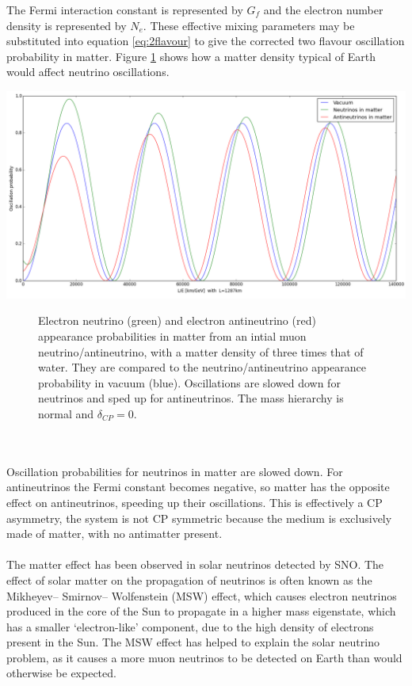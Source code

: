 \documentclass[12pt]{article}
\begin{document}
The Fermi interaction constant is represented by $G_f$ and the electron number density is represented by $N_e$. These effective mixing parameters may be substituted into equation \ref{eq:2flavour} to give the corrected two flavour oscillation probability in matter. Figure \ref{fig:2_flavourmatter} shows how a matter density typical of Earth would affect neutrino oscillations.
\begin{center}
\includegraphics[scale=0.4]{2_flavourmatter.png}
\begin{figure}[h!]
\caption{Electron neutrino (green) and electron antineutrino (red) appearance probabilities in matter from an intial muon neutrino/antineutrino, with a matter density of three times that of water. They are compared to the neutrino/antineutrino appearance probability in vacuum (blue). Oscillations are slowed down for neutrinos and sped up for antineutrinos. The mass hierarchy is normal and $\delta_{CP}=0$.}
\label{fig:2_flavourmatter}
\end{figure}
\end{center}\\\\
Oscillation probabilities for neutrinos in matter are slowed down. For antineutrinos the Fermi constant becomes negative, so matter has the opposite effect on antineutrinos, speeding up their oscillations. This is effectively a CP asymmetry, the system is not CP symmetric because the medium is exclusively made of matter, with no antimatter present.\\\\
The matter effect has been observed in solar neutrinos detected by SNO\cite{SNO}. The effect of solar matter on the propagation of neutrinos is often known as the Mikheyev– Smirnov– Wolfenstein (MSW) effect, which causes electron neutrinos produced in the core of the Sun to propagate in a higher mass eigenstate, which has a smaller `electron-like' component, due to the high density of electrons present in the Sun. The MSW effect has helped to explain the solar neutrino problem, as it causes a more muon neutrinos to be detected on Earth than would otherwise be expected.\\\\
\end{document}
